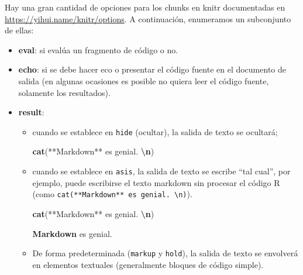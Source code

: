 \documentclass[12pt,a4paper,]{book}
\newenvironment{Shaded}{\begin{snugshade}}{\end{snugshade}}
\newcommand{\FunctionTok}[1]{\textcolor[rgb]{0.13,0.29,0.53}{\textbf{#1}}}
\newcommand{\NormalTok}[1]{#1}
\newcommand{\SpecialCharTok}[1]{\textcolor[rgb]{0.81,0.36,0.00}{\textbf{#1}}}
\newcommand{\StringTok}[1]{\textcolor[rgb]{0.31,0.60,0.02}{#1}}
\numberwithin{dummy}{section}
\theoremstyle{ocrenumbox}
\theoremstyle{blacknumex}
\theoremstyle{blacknumbox}
\theoremstyle{ocrenum}
\theoremstyle{ocrenum}
\newenvironment{markdownsal}{\begin{mBox}}{\end{mBox}}
\newcommand{\bmarkdownsal}{\begin{markdownsal}}
\newcommand{\emarkdownsal}{\end{markdownsal}}
\begin{document}
Hay una gran cantidad de opciones para los chunks en knitr documentadas
en \url{https://yihui.name/knitr/options}. A continuación, enumeramos un
subconjunto de ellas:

\begin{itemize}
\item
  \textbf{eval}: si evalúa un fragmento de código o no.
\item
  \textbf{echo}: si se debe hacer eco o presentar el código fuente en el
  documento de salida (en algunas ocasiones es posible no quiera leer el
  código fuente, solamente los resultados).
\item
  \textbf{result}:

  \begin{itemize}
  \item
    cuando se establece en
    \texttt{\textquotesingle{}hide\textquotesingle{}} (ocultar), la
    salida de texto se ocultará;

    \bmarkdownsal

\begin{Shaded}
\begin{Highlighting}[]
\FunctionTok{cat}\NormalTok{(}\StringTok{\textquotesingle{}**Markdown** es genial. }\SpecialCharTok{\textbackslash{}n}\StringTok{\textquotesingle{}}\NormalTok{)}
\end{Highlighting}
\end{Shaded}

    \emarkdownsal
  \item
    cuando se establece en
    \texttt{\textquotesingle{}asis\textquotesingle{}}, la salida de
    texto se escribe ``tal cual'', por ejemplo, puede escribirse el
    texto markdown sin procesar el código R (como
    \texttt{cat(\textquotesingle{}**Markdown**\ es\ genial.\ \textbackslash{}n\textquotesingle{})}).

    \bmarkdownsal

\begin{Shaded}
\begin{Highlighting}[]
\FunctionTok{cat}\NormalTok{(}\StringTok{\textquotesingle{}**Markdown** es genial. }\SpecialCharTok{\textbackslash{}n}\StringTok{\textquotesingle{}}\NormalTok{)}
\end{Highlighting}
\end{Shaded}

    \textbf{Markdown} es genial. \emarkdownsal
  \item
    De forma predeterminada
    (\texttt{\textquotesingle{}markup\textquotesingle{}} y
    \texttt{\textquotesingle{}hold\textquotesingle{}}), la salida de
    texto se envolverá en elementos textuales (generalmente bloques de
    código simple).


\end{itemize}
\end{itemize}
\end{document}
